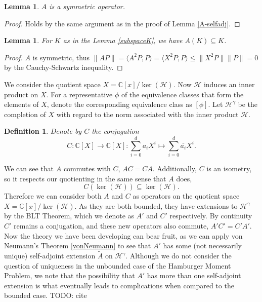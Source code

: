 \documentclass[12pt,oneside]{report}
\newtheorem{lem}[thm]{Lemma}
\newtheorem{defn}[thm]{Definition}
\begin{document}
\begin{lem}\label{A-symm}
    $A$ is a symmetric operator.
\end{lem}
\begin{proof}
    Holds by the same argument as in the proof of Lemma \ref{A-selfadj}.
\end{proof}

\begin{lem}
    For $K$ as in the Lemma \ref{subspaceK}, we have $A(K) \subseteq K$.
\end{lem}
\begin{proof}
    $A$ is symmetric, thus
    $\|AP\| = \langle A^{2}P, P \rangle = \langle X^{2}P, P \rangle \leq \|X^{2}P\|\|P\| = 0$
    by the Cauchy-Schwartz inequality.
\end{proof}

We consider the quotient space $X = \mathbb{C}[x]/\ker(\mathcal{H})$. Now $\mathcal{H}$ induces an inner product on $X$. For a representative $\phi$ of the equivalence classes that form the elements of $X$, denote the corresponding equivalence class as $[\phi]$. Let $\mathscr{H}^{\gamma}$ be the completion of $X$ with regard to the norm associated with the inner product $\mathcal{H}$.

\begin{defn}
    Denote by $C$ the conjugation $$C: \mathbb{C}[X] \to \mathbb{C}[X]: \sum_{i=0}^{d}a_{i}X^{i} \mapsto \sum_{i=0}^{d}\overline{a_{i}}X^{i}.$$
\end{defn}

We can see that $A$ commutes with $C$, $AC = CA$. Additionally, $C$ is an isometry, so it respects our quotienting in the same sense that $A$ does,
$$C(\ker(\mathcal{H})) \subseteq \ker(\mathcal{H}).$$
Therefore we can consider both $A$ and $C$ as operators on the quotient space $X = \mathbb{C}[x]/\ker(\mathcal{H})$. As they are both bounded, they have extensions to $\mathscr{H}^\gamma$ by the BLT Theorem, which we denote as $A'$ and $C'$ respectively. By continuity $C'$ remains a conjugation, and these new operators also commute, $A'C' = C'A'$. Now the theory we have been developing can bear fruit, as we can apply von Neumann's Theorem \ref{vonNeumann} to see that $A'$ has some (not necessarily unique) self-adjoint extension $\tilde{A}$ on $\mathscr{H}^\gamma$. Although we do not consider the question of uniqueness in the unbounded case of the Hamburger Moment Problem, we note that the possibility that $A'$ has more than one self-adjoint extension is what eventually leads to complications when compared to the bounded case. TODO: cite
\end{document}
